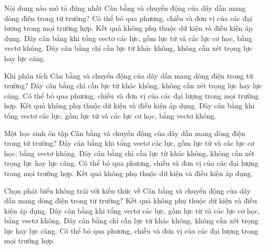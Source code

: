 \begin{ex}
Nội dung nào mô tả đúng nhất Cân bằng và chuyển động của dây dẫn mang dòng điện trong từ trường?
\choice
{Có thể bỏ qua phương, chiều và đơn vị của các đại lượng trong mọi trường hợp.}
{Kết quả không phụ thuộc dữ kiện và điều kiện áp dụng.}
{\True Dây cân bằng khi tổng vectơ các lực, gồm lực từ và các lực cơ học, bằng vectơ không.}
{Dây cân bằng chỉ cần lực từ khác không, không cần xét trọng lực hay lực căng.}
\end{ex}

\begin{ex}
Khi phân tích Cân bằng và chuyển động của dây dẫn mang dòng điện trong từ trường?
\choice
{Dây cân bằng chỉ cần lực từ khác không, không cần xét trọng lực hay lực căng.}
{Có thể bỏ qua phương, chiều và đơn vị của các đại lượng trong mọi trường hợp.}
{Kết quả không phụ thuộc dữ kiện và điều kiện áp dụng.}
{\True Dây cân bằng khi tổng vectơ các lực, gồm lực từ và các lực cơ học, bằng vectơ không.}
\end{ex}

\begin{ex}
Một học sinh ôn tập Cân bằng và chuyển động của dây dẫn mang dòng điện trong từ trường?
\choice
{\True Dây cân bằng khi tổng vectơ các lực, gồm lực từ và các lực cơ học, bằng vectơ không.}
{Dây cân bằng chỉ cần lực từ khác không, không cần xét trọng lực hay lực căng.}
{Có thể bỏ qua phương, chiều và đơn vị của các đại lượng trong mọi trường hợp.}
{Kết quả không phụ thuộc dữ kiện và điều kiện áp dụng.}
\end{ex}

\begin{ex}
Chọn phát biểu không trái với kiến thức về Cân bằng và chuyển động của dây dẫn mang dòng điện trong từ trường?
\choice
{Kết quả không phụ thuộc dữ kiện và điều kiện áp dụng.}
{\True Dây cân bằng khi tổng vectơ các lực, gồm lực từ và các lực cơ học, bằng vectơ không.}
{Dây cân bằng chỉ cần lực từ khác không, không cần xét trọng lực hay lực căng.}
{Có thể bỏ qua phương, chiều và đơn vị của các đại lượng trong mọi trường hợp.}
\end{ex}

